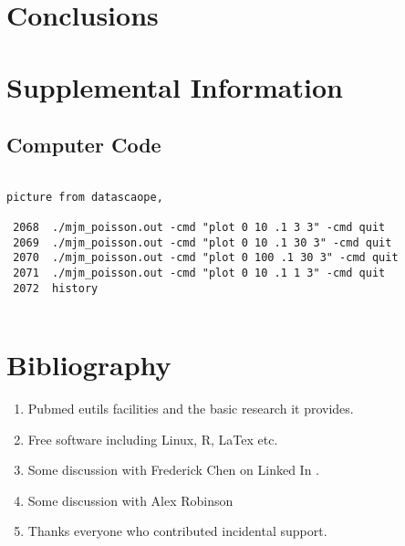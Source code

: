 



\section{Conclusions}

\section{Supplemental Information}

\subsection{Computer Code}


\begin{lstlisting}

picture from datascaope, 

 2068  ./mjm_poisson.out -cmd "plot 0 10 .1 3 3" -cmd quit
 2069  ./mjm_poisson.out -cmd "plot 0 10 .1 30 3" -cmd quit
 2070  ./mjm_poisson.out -cmd "plot 0 100 .1 30 3" -cmd quit
 2071  ./mjm_poisson.out -cmd "plot 0 10 .1 1 3" -cmd quit
 2072  history


\end{lstlisting}
\section{Bibliography}






\begin{acknowledgments} 

% 
\begin{enumerate}
\item Pubmed eutils facilities and the basic research it provides. 
\item Free software including Linux, R, LaTex  etc.
\item Some discussion with Frederick Chen   on Linked In \cite{Chen_Chen_Chen_Kaohsiung_City_Kaohsiung_City_2025}.
\item Some discussion with Alex Robinson \cite{Robinson_West_Midlands_England_United_2025}
\item Thanks everyone who contributed incidental support. 
\end{enumerate}

\end{acknowledgments}

